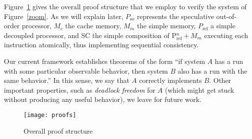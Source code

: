 Figure~\ref{proofs} gives the overall proof structure that we employ to verify
the system of Figure~\ref{zoom}. As we will explain later, $P_\text{so}$
represents the speculative out-of-order processor, $M_c$ the cache memory,
$M_m$ the simple memory, $P_\text{ref}$ a simple decoupled processor, and
SC the simple composition of P$^n_\text{ref}+ M_m$ executing each
instruction atomically, thus implementing sequential consistency.

Our current framework establishes theorems of the form ``if system $A$ has a run
with some particular observable behavior, then system $B$ also has a run with
the same behavior.''  In this sense, we say that $A$ correctly implements $B$.
Other important properties, such as \emph{deadlock freedom} for $A$ (which
might get stuck without producing any useful behavior), we leave for future
work.

\begin{figure}
\texttt{[image: proofs]}
\caption{Overall proof structure}
\label{proofs}
\end{figure}

